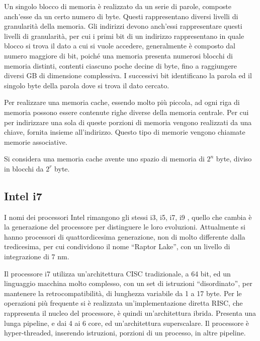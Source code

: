 \documentclass{article}
\numberwithin{equation}{subsection}
\begin{document}

Un singolo blocco di memoria è realizzato da un serie di parole, composte anch'esse da un certo numero di byte. Questi rappresentano diversi livelli di granularità della memoria. 
Gli indirizzi devono anch'essi rappresentare questi livelli di granularità, per cui i primi bit di un indirizzo rappresentano in quale blocco si trova il dato a cui si vuole 
accedere, generalmente è composto dal numero maggiore di bit, poiché una memoria presenta numerosi blocchi di memoria distinti, contenti ciascuno poche decine di byte, fino 
a raggiungere diversi GB di dimensione complessiva. I successivi bit identificano la parola ed il singolo byte della parola dove si trova il dato cercato. 

Per realizzare una memoria cache, essendo molto più piccola, ad ogni riga di memoria possono essere contenute righe diverse della memoria centrale. Per cui per indirizzare una 
sola di queste porzioni di memoria vengono realizzati da una chiave, fornita insieme all'indirizzo. Questo tipo di memorie vengono chiamate memorie associative. 

Si considera una memoria cache avente uno spazio di memoria di $2^n$ byte, diviso in blocchi da $2^r$ byte. 


\subsection{Intel i7}

I nomi dei processori Intel rimangono gli stessi i3, i5, i7, i9 , quello che cambia è la generazione del processore per distinguere le loro evoluzioni. Attualmente si hanno 
processori di quattordicesima generazione, non di molto differente dalla tredicesima, per cui condividono il nome ``Raptor Lake'', con un livello di integrazione di 7 nm. 

Il processore i7 utilizza un'architettura CISC tradizionale, a 64 bit, ed un linguaggio macchina molto complesso, con un set di istruzioni ``disordinato'', per mantenere la 
retrocompatibilità, di lunghezza variabile da 1 a 17 byte. 
Per le operazioni più frequente si è realizzata un'implementazione diretta RISC, che rappresenta il nucleo del processore, è quindi un'architettura ibrida. Presenta una lunga 
pipeline, e dai 4 ai 6 core, ed un'architettura superscalare. 
Il processore è hyper-threaded, inserendo istruzioni, porzioni di un processo, in altre pipeline. 
\end{document}

